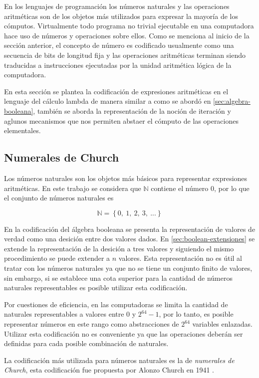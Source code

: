 En los lenguajes de programación los números naturales y las operaciones aritméticas son de los objetos más utilizados para expresar la mayoría de los cómputos. Virtualmente todo programa no trivial ejecutable en una computadora hace uso de números y operaciones sobre ellos. Como se menciona al inicio de la sección anterior, el concepto de número es codificado usualmente como una secuencia de bits de longitud fija y las operaciones aritméticas terminan siendo traducidas a instrucciones ejecutadas por la unidad aritmética lógica de la computadora.

En esta sección se plantea la codificación de expresiones aritméticas en el lenguaje del cálculo lambda de manera similar a como se abordó en \ref{sec:algebra-booleana}, también se aborda la representación de la noción de iteración y aglunos mecanismos que nos permiten abstaer el cómputo de las operaciones elementales.

\subsection{Numerales de Church}
\label{sec:numerales}

Los números naturales son los objetos más básicos para representar expresiones aritméticas. En este trabajo se considera que \( \mathbb{N} \) contiene el número 0, por lo que el conjunto de números naturales es

\[ \mathbb{N} = \left\{ 0,\ 1,\ 2,\ 3,\ ... \right\} \]

En la codificación del álgebra booleana se presenta la representación de valores de verdad como una desición entre dos valores dados. En \ref{sec:boolean-extensiones} se extende la representación de la desición a tres valores y siguiendo el mismo procedimiento se puede extender a \( n \) valores. Esta representación no es útil al tratar con los números naturales ya que no se tiene un conjunto finito de valores, sin embargo, si se establece una cota superior para la cantidad de números naturales representables es posible utilizar esta codificación.

Por cuestiones de eficiencia, en las computadoras se limita la cantidad de naturales representables a valores entre 0 y \( 2^{64}-1 \), por lo tanto, es posible representar números en este rango como abstracciones de \( 2^{64} \) variables enlazadas. Utilizar esta codificación no es conveniente ya que las operaciones deberán ser definidas para cada posible combinación de naturales.

La codificación más utilizada para números naturales es la de \emph{numerales de Church}, esta codificación fue propuesta por Alonzo Church en 1941 \cite[p.~28]{Church:LambdaConversion}.


